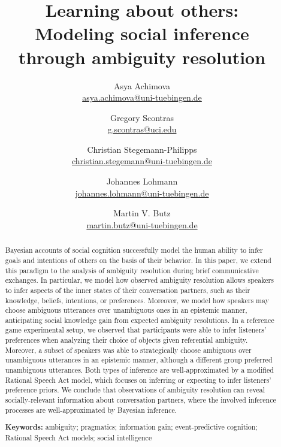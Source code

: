 \documentclass[11pt,a4paper]{article}
\title{Learning about others:\\
	Modeling social inference \\ through ambiguity resolution
}
\author{
		Asya Achimova\\
		\href{mailto:asya.achimova@uni-tuebingen.de}{asya.achimova@uni-tuebingen.de}
	\and
		Gregory Scontras\\
		\href{mailto:g.scontras@uci.edu}{g.scontras@uci.edu}
	\and 
		Christian Stegemann-Philipps\\
		\href{mailto:christian.stegemann@uni-tuebingen.de}{christian.stegemann@uni-tuebingen.de}
	\and
		Johannes Lohmann\\
		\href{mailto:johannes.lohmann@uni-tuebingen.de}{johannes.lohmann@uni-tuebingen.de}
	\and
		Martin V. Butz \\
		\href{mailto:martin.butz@uni-tuebingen.de}{martin.butz@uni-tuebingen.de}
}
\begin{document}
\maketitle

\begin{abstract}
Bayesian accounts of social cognition successfully model the human ability to infer goals and intentions of others on the basis of their behavior.
In this paper, we extend this paradigm to the analysis of ambiguity resolution during brief communicative exchanges. 
In particular, we model how observed ambiguity resolution allows speakers to infer aspects of the inner states of
their conversation partners, such as their knowledge, beliefs, intentions, or preferences.
Moreover, we model how speakers may choose ambiguous utterances over unambiguous ones in an epistemic manner, anticipating social knowledge gain from expected ambiguity resolutions. 
In a reference game experimental setup, we observed that participants were able to infer listeners' preferences when analyzing their choice of objects given referential ambiguity.
Moreover, a subset of speakers was able to strategically choose ambiguous over unambiguous utterances in an epistemic manner, although a different group preferred unambiguous utterances. 
Both types of inference are well-approximated by a modified Rational Speech Act model, which focuses on inferring or expecting to infer listeners' preference priors.
We conclude that observations of ambiguity resolution can reveal socially-relevant information about conversation partners, where the involved inference processes are well-approximated by Bayesian inference. 
                                                                 

\textbf{Keywords:} 
ambiguity; pragmatics; information gain; event-predictive cognition; Rational Speech Act models; social intelligence
\end{abstract}
\end{document}
